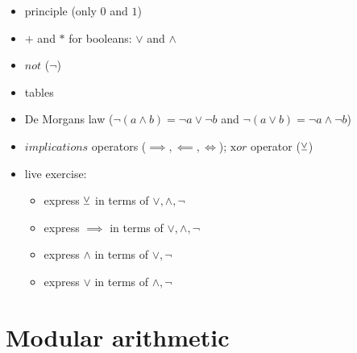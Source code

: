 \begin{itemize}
\tightlist
\item
  principle (only \(0\) and \(1\))
\item
  \(+\) and \(*\) for booleans: \(\lor\) and \(\land\)
\item
  \(not\) (\(\lnot\))
\item
  tables
\item
  De Morgan\textquotesingle s law
  (\(\lnot (a \land b) = \lnot a \lor \lnot b\) and
  \(\lnot (a \lor b) = \lnot a \land \lnot b\))
\item
  \(implications\) operators (\(\implies, \impliedby, \iff\));
  \(\text{x}or\) operator (\(\veebar\))
\item
  live exercise:

  \begin{itemize}
  \tightlist
  \item
    express \(\veebar\) in terms of \(\lor, \land, \lnot\)
  \item
    express \(\implies\) in terms of \(\lor, \land, \lnot\)
  \item
    express \(\land\) in terms of \(\lor, \lnot\)
  \item
    express \(\lor\) in terms of \(\land, \lnot\)
  \end{itemize}
\end{itemize}

\hypertarget{modular-arithmetic}{%
\section{Modular arithmetic}\label{modular-arithmetic}}


